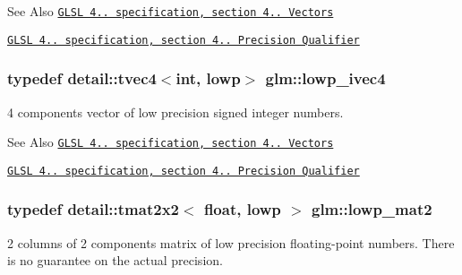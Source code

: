 \begin{DoxySeeAlso}{See Also}
\href{http://www.opengl.org/registry/doc/GLSLangSpec.4.20.8.pdf}{\tt G\-L\-S\-L 4.. specification, section 4.. Vectors} 

\href{http://www.opengl.org/registry/doc/GLSLangSpec.4.20.8.pdf}{\tt G\-L\-S\-L 4.. specification, section 4.. Precision Qualifier} 
\end{DoxySeeAlso}
\hypertarget{group__core__precision_gab9b404ae623385d5094499d2d4e4616d}{
\subsubsection[{lowp\-\_\-ivec4}]{\setlength{\rightskip}{0pt plus 5cm}typedef detail\-::tvec4$<$int, lowp$>$ {\bf glm\-::lowp\-\_\-ivec4}}}\label{group__core__precision_gab9b404ae623385d5094499d2d4e4616d}
4 components vector of low precision signed integer numbers.

\begin{DoxySeeAlso}{See Also}
\href{http://www.opengl.org/registry/doc/GLSLangSpec.4.20.8.pdf}{\tt G\-L\-S\-L 4.. specification, section 4.. Vectors} 

\href{http://www.opengl.org/registry/doc/GLSLangSpec.4.20.8.pdf}{\tt G\-L\-S\-L 4.. specification, section 4.. Precision Qualifier} 
\end{DoxySeeAlso}
\hypertarget{group__core__precision_gac0acc3ccf8da050af3393ea639f698d6}{
\subsubsection[{lowp\-\_\-mat2}]{\setlength{\rightskip}{0pt plus 5cm}typedef detail\-::tmat2x2$<$ float, lowp $>$ {\bf glm\-::lowp\-\_\-mat2}}}\label{group__core__precision_gac0acc3ccf8da050af3393ea639f698d6}
2 columns of 2 components matrix of low precision floating-\/point numbers. There is no guarantee on the actual precision.

